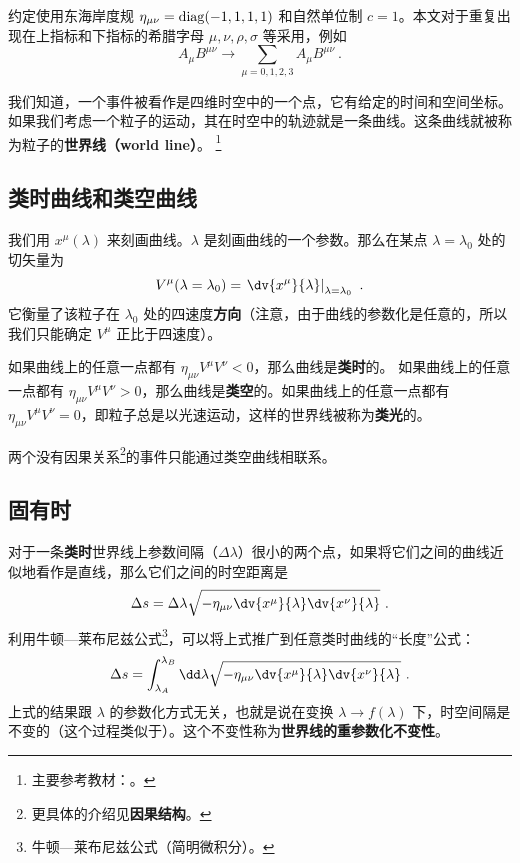 

约定使用东海岸度规 $\eta_{\mu\nu}=\rm{diag}(-1,1,1,1)$ 和自然单位制 $c=1$。本文对于重复出现在上指标和下指标的希腊字母 $\mu,\nu,\rho,\sigma$ 等采用，例如
\begin{equation}
A_\mu B^{\mu\nu}\rightarrow \sum_{\mu=0,1,2,3}A_\mu B^{\mu\nu} ~.
\end{equation}


我们知道，一个事件被看作是四维时空中的一个点，它有给定的时间和空间坐标。如果我们考虑一个粒子的运动，其在时空中的轨迹就是一条曲线。这条曲线就被称为粒子的\textbf{世界线（world line）}。
\footnote{主要参考教材：\cite{陈斌广相}。}

\subsection{类时曲线和类空曲线}
我们用 $x^\mu(\lambda)$ 来刻画曲线。$\lambda$ 是刻画曲线的一个参数。那么在某点 $\lambda=\lambda_0$ 处的切矢量为
\begin{equation}
\begin{aligned}
V^\mu(\lambda=\lambda_0)=\left.\dv{x^\mu}{\lambda}\right|_{\lambda=\lambda_0}~.
\end{aligned}
\end{equation}
它衡量了该粒子在 $\lambda_0$ 处的四速度\textbf{方向}（注意，由于曲线的参数化是任意的，所以我们只能确定 $V^\mu$ 正比于四速度）。

如果曲线上的任意一点都有 $\eta_{\mu\nu}V^\mu V^\nu<0$，那么曲线是\textbf{类时}的。
如果曲线上的任意一点都有 $\eta_{\mu\nu}V^\mu V^\nu>0$，那么曲线是\textbf{类空}的。如果曲线上的任意一点都有 $\eta_{\mu\nu}V^\mu V^\nu=0$，即粒子总是以光速运动，这样的世界线被称为\textbf{类光}的。

两个没有因果关系\footnote{更具体的介绍见\textbf{因果结构}。}的事件只能通过类空曲线相联系。

\subsection{固有时}
对于一条\textbf{类时}世界线上参数间隔（$\Delta \lambda$）很小的两个点，如果将它们之间的曲线近似地看作是直线，那么它们之间的时空距离是
\begin{equation}
\Delta s=\Delta \lambda \sqrt{-\eta_{\mu\nu}\dv{x^\mu}{\lambda} \dv{x^\nu}{\lambda}}~.
\end{equation}
利用牛顿—莱布尼兹公式\footnote{牛顿—莱布尼兹公式（简明微积分）。}，可以将上式推广到任意类时曲线的“长度”公式：
\begin{equation}\label{eq_wdline_2}
\Delta s=\int_{\lambda_A}^{\lambda_B} \dd\lambda \sqrt{-\eta_{\mu\nu}\dv{x^\mu}{\lambda} \dv{x^\nu}{\lambda}}~.
\end{equation}
上式的结果跟 $\lambda$ 的参数化方式无关，也就是说在变换 $\lambda\rightarrow f(\lambda)$ 下，时空间隔是不变的（这个过程类似于）。这个不变性称为\textbf{世界线的重参数化不变性}。

